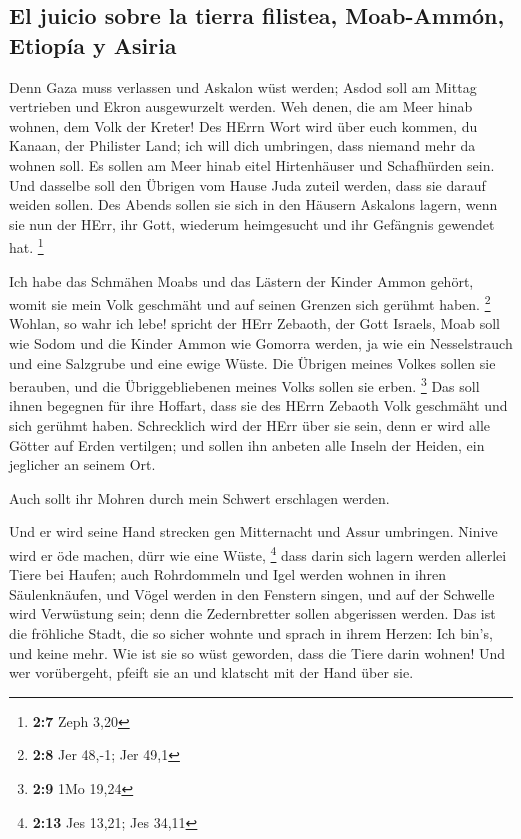 \hypertarget{el-juicio-sobre-la-tierra-filistea-moab-ammuxf3n-etiopuxeda-y-asiria}{%
\subsection{El juicio sobre la tierra filistea, Moab-Ammón, Etiopía y
Asiria}\label{el-juicio-sobre-la-tierra-filistea-moab-ammuxf3n-etiopuxeda-y-asiria}}

 Denn Gaza muss verlassen und Askalon wüst werden; Asdod
soll am Mittag vertrieben und Ekron ausgewurzelt werden. 
Weh denen, die am Meer hinab wohnen, dem Volk der Kreter! Des HErrn Wort
wird über euch kommen, du Kanaan, der Philister Land; ich will dich
umbringen, dass niemand mehr da wohnen soll.  Es sollen am
Meer hinab eitel Hirtenhäuser und Schafhürden sein.  Und
dasselbe soll den Übrigen vom Hause Juda zuteil werden, dass sie darauf
weiden sollen. Des Abends sollen sie sich in den Häusern Askalons
lagern, wenn sie nun der HErr, ihr Gott, wiederum heimgesucht und ihr
Gefängnis gewendet hat. \footnote{\textbf{2:7} Zeph 3,20}

 Ich habe das Schmähen Moabs und das Lästern der Kinder
Ammon gehört, womit sie mein Volk geschmäht und auf seinen Grenzen sich
gerühmt haben. \footnote{\textbf{2:8} Jer 48,-1; Jer 49,1}
 Wohlan, so wahr ich lebe! spricht der HErr Zebaoth, der
Gott Israels, Moab soll wie Sodom und die Kinder Ammon wie Gomorra
werden, ja wie ein Nesselstrauch und eine Salzgrube und eine ewige
Wüste. Die Übrigen meines Volkes sollen sie berauben, und die
Übriggebliebenen meines Volks sollen sie erben. \footnote{\textbf{2:9}
  1Mo 19,24}  Das soll ihnen begegnen für ihre Hoffart,
dass sie des HErrn Zebaoth Volk geschmäht und sich gerühmt haben.
 Schrecklich wird der HErr über sie sein, denn er wird
alle Götter auf Erden vertilgen; und sollen ihn anbeten alle Inseln der
Heiden, ein jeglicher an seinem Ort.

 Auch sollt ihr Mohren durch mein Schwert erschlagen
werden.

 Und er wird seine Hand strecken gen Mitternacht und
Assur umbringen. Ninive wird er öde machen, dürr wie eine Wüste,
\footnote{\textbf{2:13} Jes 13,21; Jes 34,11}  dass darin
sich lagern werden allerlei Tiere bei Haufen; auch Rohrdommeln und Igel
werden wohnen in ihren Säulenknäufen, und Vögel werden in den Fenstern
singen, und auf der Schwelle wird Verwüstung sein; denn die
Zedernbretter sollen abgerissen werden.  Das ist die
fröhliche Stadt, die so sicher wohnte und sprach in ihrem Herzen: Ich
bin's, und keine mehr. Wie ist sie so wüst geworden, dass die Tiere
darin wohnen! Und wer vorübergeht, pfeift sie an und klatscht mit der
Hand über sie.

